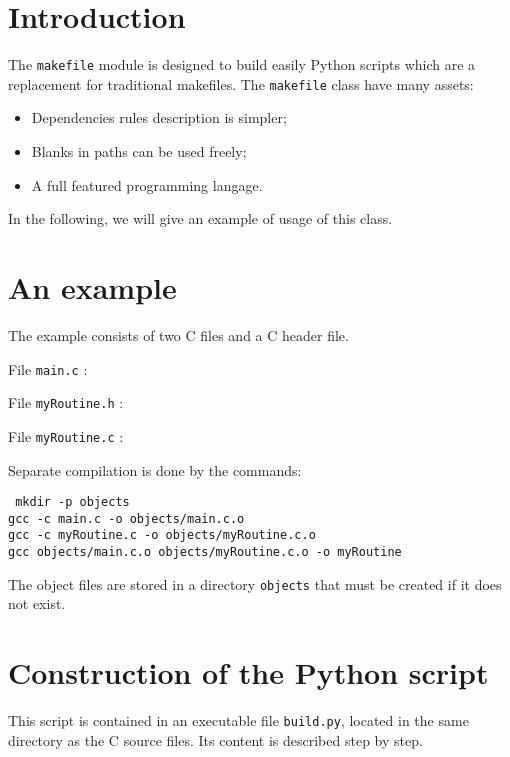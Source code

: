 \documentclass[a4paper,11pt]{extarticle}
\begin{document}
\section{Introduction}

The \texttt{makefile} module is designed to build easily Python scripts which are a replacement for traditional makefiles. The \texttt{makefile} class have many assets:

\begin{itemize}
  \item Dependencies rules description is simpler;
  \item Blanks in paths can be used freely;
  \item A full featured programming langage. 
\end{itemize}

In the following, we will give an example of usage of this class.

\section{An example}

The example consists of two C files and a C header file.

File \texttt{main.c} :



File \texttt{myRoutine.h} :



File \texttt{myRoutine.c} :


Separate compilation is done by the commands:

\begin{mdframed}[hidealllines=true,backgroundcolor=lightgray!20]
\tt\footnotesize
mkdir -p objects\\
gcc -c main.c -o objects/main.c.o\\
gcc -c myRoutine.c -o objects/myRoutine.c.o\\
gcc objects/main.c.o objects/myRoutine.c.o -o myRoutine
\end{mdframed}


The object files are stored in a directory \texttt{objects} that must be created if it does not exist.


\section{Construction of the Python script}

This script is contained in an executable file \texttt{build.py}, located in the same directory as the C source files. Its content is described step by step.
\end{document}
